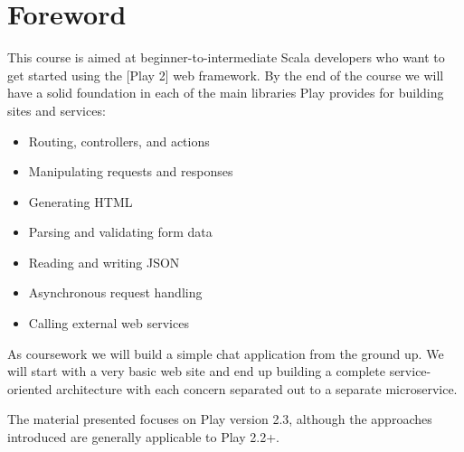 \pagebreak


\section{Foreword}\label{foreword}

This course is aimed at beginner-to-intermediate Scala developers who
want to get started using the {[}Play 2{]} web framework. By the end of
the course we will have a solid foundation in each of the main libraries
Play provides for building sites and services:

\begin{itemize}
\itemsep1pt\parskip0pt
\item
  Routing, controllers, and actions
\item
  Manipulating requests and responses
\item
  Generating HTML
\item
  Parsing and validating form data
\item
  Reading and writing JSON
\item
  Asynchronous request handling
\item
  Calling external web services
\end{itemize}

As coursework we will build a simple chat application from the ground
up. We will start with a very basic web site and end up building a
complete service-oriented architecture with each concern separated out
to a separate microservice.

The material presented focuses on Play version 2.3, although the
approaches introduced are generally applicable to Play 2.2+.
